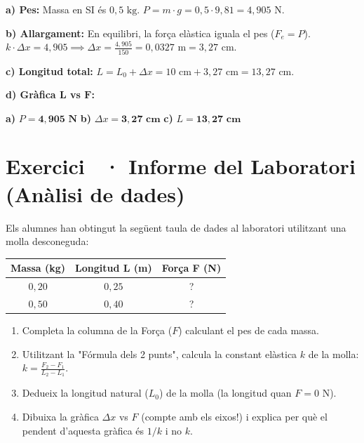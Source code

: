 \documentclass[12pt,a4paper,twoside]{article}
\newcounter{exercici}
\newcommand{\exercici}[1]{%
  \stepcounter{exercici}
  \section*{Exercici \theexercici\ \textnormal{· #1}}
  \vspace{-10pt}
}
\begin{document}
{\color{blue}
\textbf{a) Pes:} Massa en SI és $0{,}5\text{ kg}$. $P = m \cdot g = 0{,}5 \cdot 9{,}81 = 4{,}905\text{ N}$.

\textbf{b) Allargament:} En equilibri, la força elàstica iguala el pes ($F_e = P$).\\
$k \cdot \Delta x = 4{,}905 \implies \Delta x = \frac{4{,}905}{150} = 0{,}0327\text{ m} = 3{,}27\text{ cm}$.

\textbf{c) Longitud total:} $L = L_0 + \Delta x = 10\text{ cm} + 3{,}27\text{ cm} = 13{,}27\text{ cm}$.

\textbf{d) Gràfica $\mathbf{L}$ vs $\mathbf{F}$:}
\begin{center}
\end{center}

\begin{tcolorbox}[title=Respostes Finals,colframe=red!70!black,colback=red!5,sharp corners=south,fontupper=\color{blue}]
\textbf{a)} $P = \mathbf{4{,}905\text{ N}}$ \quad \textbf{b)} $\Delta x = \mathbf{3{,}27\text{ cm}}$ \quad \textbf{c)} $L = \mathbf{13{,}27\text{ cm}}$
\end{tcolorbox}
}

\clearpage
\exercici{Informe del Laboratori (Anàlisi de dades)}
Els alumnes han obtingut la següent taula de dades al laboratori utilitzant una molla desconeguda:
\begin{center}
\begin{tabular}{|c|c|c|}
\hline
\textbf{Massa (kg)} & \textbf{Longitud L (m)} & \textbf{Força F (N)} \\
\hline
$0{,}20$ & $0{,}25$ & ? \\
$0{,}50$ & $0{,}40$ & ? \\
\hline
\end{tabular}
\end{center}
\begin{enumerate}[label=\textbf{\alph*)}]
  \item Completa la columna de la Força ($F$) calculant el pes de cada massa.
  \item Utilitzant la "Fórmula dels 2 punts", calcula la constant elàstica $k$ de la molla: $k = \frac{F_2 - F_1}{L_2 - L_1}$.
  \item Dedueix la longitud natural ($L_0$) de la molla (la longitud quan $F = 0\text{ N}$).
  \item Dibuixa la gràfica $\Delta x$ vs $F$ (compte amb els eixos!) i explica per què el pendent d'aquesta gràfica és $1/k$ i no $k$.
\end{enumerate}
\end{document}
